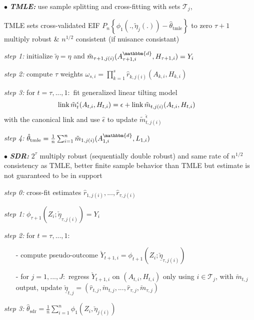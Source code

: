 \documentclass[8pt,twoside]{extarticle}
\begin{document}
\begin{multicols}{2}
 $\bullet$ \textit{\textbf{TMLE:}} use sample splitting and cross-fitting with sets $\mathcal{T}_j$,

 TMLE sets cross-validated EIF $P_n\!\left\{\phi_1(.,\tilde{\eta}_j(.)){-}\hat{\theta}_{\text{tmle}}\right\} $ to zero 
$\tau{+}1$ multiply robust \& $n^{1/2}$ consistent (if nuisance consistant)


 \textit{step 1:} initialize $\tilde{\eta} = \hat{\eta}$ and $\tilde{m}_{\tau+1,j(i)}(A_{\tau+1,i}^{\mathbbm{d}},H_{\tau+1,i}) = Y_i$

 \textit{step 2:} compute $\tau$ weights $\omega_{s,i}=\prod_{k=1}^s \hat{r}_{k,j(i)}(A_{k,i},H_{k,i})$

 \textit{step 3:} for $t=\tau,...,1:$ fit generalized linear tilting model 
$$\hspace{-1em}\mathrm{link}\, \tilde{m}_{t}^\epsilon(A_{t,i},H_{t,i}) = \epsilon + \mathrm{link} \,\tilde{m}_{t,j(i)}(A_{t,i},H_{t,i})$$ with the canonical link and use $\hat{\epsilon}$ to update $\tilde{m}_{t, j(i)}^{\hat{\epsilon}}$

 \textit{step 4:} $\hat{\theta}_{\text{tmle}} = \frac{1}{n} \sum_{i=1}^n \tilde{m}_{1,j(i)}(A^{\mathbbm{d}}_{1,i},L_{1,i})$





 $\bullet$ \textit{\textbf{SDR:}} $2^\tau$ multiply robust (sequentially double robust) and 
same rate of $n^{1/2}$ consistency as TMLE, better finite sample behavior than TMLE but estimate is not guaranteed to be in support

 \textit{step 0:} cross-fit estimates $\hat{r}_{1,j(i)},..., \hat{r}_{\tau,j(i)}$


 \textit{step 1:} $\phi_{\tau+1}(Z_i;\underline{\check{\eta}}_{\tau,j(i)})=Y_i$

 \textit{step 2:} for $t=\tau,...,1:$
\begin{itemize}[leftmargin=*, itemsep=0em, topsep=0pt, partopsep=0pt,parsep=0pt]
\item[-] compute pseudo-outcome $\check{Y}_{t+1,i} =   \phi_{t+1}(Z_i;\underline{\check{\eta}}_{\tau,j(i)})$
\item[-] for $j=1,...,J:$ regress $\check{Y}_{t+1,i}$ on $(A_{t,i}, H_{t,i})$ only using $i \in \mathcal{T}_j$, with $\check{m}_{t,j}$ output, update $\check{\underline{\eta}}_{t,j} = (\hat{r}_{t,j},\check{m}_{t,j}, ...,\hat{r}_{\tau,j},\check{m}_{\tau,j}) $
\end{itemize}
 \textit{step 3:} $\hat{\theta}_{\text{sdr}} = \frac{1}{n} \sum_{i=1}^n \phi_1(Z_i,\check{\eta}_{j(i)})$    


\end{multicols}
\end{document}
